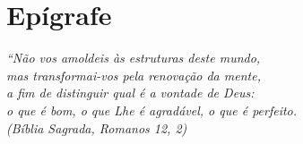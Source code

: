 
\cleardoublepage

{\color{white}
 \chapter*{Epígrafe}
}

\begin{flushright}
\vspace{17cm}
\textit{``Não vos amoldeis às estruturas deste mundo, \\
mas transformai-vos pela renovação da mente, \\
a fim de distinguir qual é a vontade de Deus: \\
o que é bom, o que Lhe é agradável, o que é perfeito.\\
(Bíblia Sagrada, Romanos 12, 2)}
\end{flushright}
